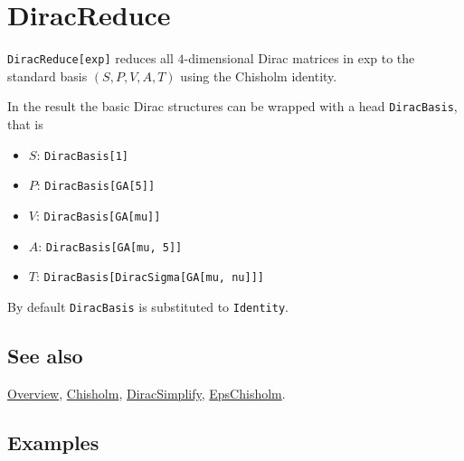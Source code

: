 \documentclass[../FeynCalcManual.tex]{subfiles}
\begin{document}
\hypertarget{diracreduce}{%
\section{DiracReduce}\label{diracreduce}}

\texttt{DiracReduce[\allowbreak{}exp]} reduces all \(4\)-dimensional
Dirac matrices in exp to the standard basis \((S, P, V, A, T)\) using
the Chisholm identity.

In the result the basic Dirac structures can be wrapped with a head
\texttt{DiracBasis}, that is

\begin{itemize}
\tightlist
\item
  \(S\): \texttt{DiracBasis[\allowbreak{}1]}
\item
  \(P\): \texttt{DiracBasis[\allowbreak{}GA[\allowbreak{}5]]}
\item
  \(V\): \texttt{DiracBasis[\allowbreak{}GA[\allowbreak{}mu]]}
\item
  \(A\):
  \texttt{DiracBasis[\allowbreak{}GA[\allowbreak{}mu,\ \allowbreak{}5]]}
\item
  \(T\):
  \texttt{DiracBasis[\allowbreak{}DiracSigma[\allowbreak{}GA[\allowbreak{}mu,\ \allowbreak{}nu]]]}
\end{itemize}

By default \texttt{DiracBasis} is substituted to \texttt{Identity}.

\subsection{See also}

\hyperlink{toc}{Overview}, \hyperlink{chisholm}{Chisholm},
\hyperlink{diracsimplify}{DiracSimplify},
\hyperlink{epschisholm}{EpsChisholm}.

\subsection{Examples}

\begin{Shaded}
\begin{Highlighting}[]
\OperatorTok{[}\SpecialCharTok{\textbackslash{}}\OperatorTok{[}\OperatorTok{],} \SpecialCharTok{\textbackslash{}}\OperatorTok{[}\OperatorTok{]]} 
 
\OperatorTok{[}\SpecialCharTok{\%}\OperatorTok{]}
\end{Highlighting}
\end{Shaded}
\end{document}
